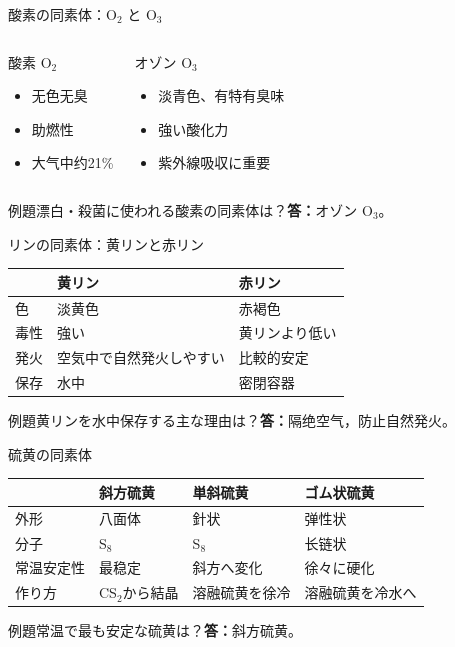 \documentclass[notheorems,aspectratio=169]{beamer}
\newcommand{\ans}[1]{\textcolor{ChemGreen}{\textbf{答：}#1}}
\begin{document}
\begin{frame}{酸素の同素体：O$_2$ と O$_3$}
\begin{columns}[T,onlytextwidth]\begin{block}{酸素 O$_2$}\begin{itemize}\item 无色无臭\item 助燃性\item 大气中约21\%\end{itemize}\end{block}
\begin{alertblock}{オゾン O$_3$}\begin{itemize}\item 淡青色、有特有臭味\item 強い酸化力\item 紫外線吸収に重要\end{itemize}\end{alertblock}\end{columns}
\begin{exampleblock}{例題}漂白・殺菌に使われる酸素の同素体は？\quad \ans{オゾン O$_3$。}\end{exampleblock}
\end{frame}

\begin{frame}{リンの同素体：黄リンと赤リン}
\small\begin{tabular}{lll}\toprule & 黄リン & 赤リン\\\midrule 色 & 淡黄色 & 赤褐色\\ 毒性 & 強い & 黄リンより低い\\ 発火 & 空気中で自然発火しやすい & 比較的安定\\ 保存 & 水中 & 密閉容器\\\bottomrule\end{tabular}
\begin{exampleblock}{例題}黄リンを水中保存する主な理由は？\quad \ans{隔绝空气，防止自然発火。}\end{exampleblock}
\end{frame}

\begin{frame}{硫黄の同素体}
\small\centering\begin{tabular}{llll}\toprule & 斜方硫黄 & 単斜硫黄 & ゴム状硫黄\\\midrule 外形 & 八面体 & 針状 & 弹性状\\ 分子 & S$_8$ & S$_8$ & 长链状\\ 常温安定性 & 最稳定 & 斜方へ変化 & 徐々に硬化\\ 作り方 & CS$_2$から結晶 & 溶融硫黄を徐冷 & 溶融硫黄を冷水へ\\\bottomrule\end{tabular}
\begin{exampleblock}{例題}常温で最も安定な硫黄は？\quad \ans{斜方硫黄。}\end{exampleblock}
\end{frame}
\end{document}
